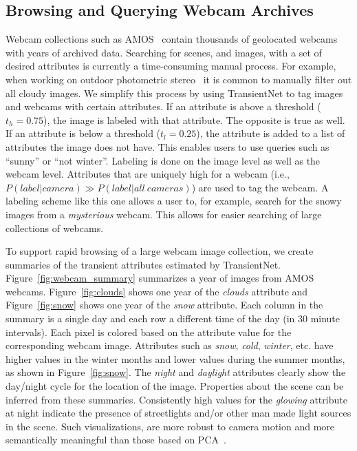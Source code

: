 \documentclass[10pt,twocolumn,letterpaper]{article}
\newcommand{\figref}[1]{Figure~\ref{fig:#1}}
\begin{document}
\subsection{Browsing and Querying Webcam Archives}

Webcam collections such as AMOS~\cite{jacobs07amos} contain thousands of
geolocated webcams with years of archived data.  Searching for scenes, and
images, with a set of desired attributes is currently a time-consuming manual
process. For example, when working on outdoor photometric
stereo~\cite{abramsheliometric} it is common to manually filter out all cloudy
images. We simplify this process by using TransientNet to tag images and
webcams with certain attributes.  If an attribute is above a threshold ($t_h =
0.75$), the image is labeled with that attribute.  The opposite is true as
well. If an attribute is below a threshold ($t_l = 0.25$), the attribute is
added to a list of attributes the image does not have. This enables users to
use queries such as ``sunny'' or ``not winter''. Labeling is done on the image
level as well as the webcam level. Attributes that are uniquely high for a
webcam (i.e., $P(label|camera)\gg P(label|all\ cameras)$) are used to tag the
webcam. A labeling scheme like this one allows a user to, for example, search
for the snowy images from a \textit{mysterious} webcam. This allows for easier
searching of large collections of webcams.

To support rapid browsing of a large webcam image collection, we create
summaries of the transient attributes estimated by TransientNet.
\figref{webcam_summary} summarizes a year of images from AMOS webcams.
\figref{clouds} shows one year of the \emph{clouds} attribute and \figref{snow}
shows one year of the \emph{snow} attribute.  Each column in the summary is a
single day and each row a different time of the day (in 30 minute intervals).
Each pixel is colored based on the attribute value for the corresponding webcam
image. Attributes such as \textit{snow}, \textit{cold}, \textit{winter}, etc.
have higher values in the winter months and lower values during the summer
months, as shown in \figref{snow}. The \textit{night} and \textit{daylight}
attributes clearly show the day/night cycle for the location of the image.
Properties about the scene can be inferred from these summaries.  Consistently
high values for the \textit{glowing} attribute at night indicate the presence
of streetlights and/or other man made light sources in the scene.  Such
visualizations, are more robust to camera motion and more semantically
meaningful than those based on PCA~\cite{jacobs09webcamdata}.
\end{document}

